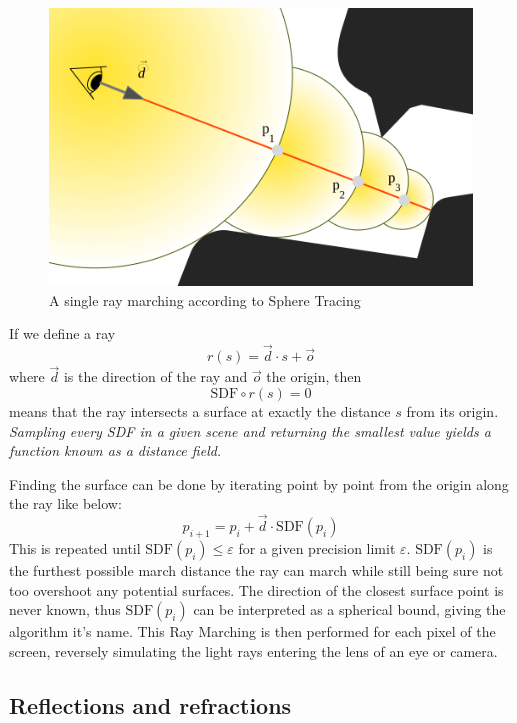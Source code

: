 		\vspace{40pt}
		\begin{figure}
			\begin{flushright}
				\includegraphics[width=0.9\linewidth]{figure/SDF2} 
			\end{flushright}
			\caption{ A single ray marching according to Sphere Tracing}
			\vspace{40pt}
		\end{figure}

		If we define a ray $$r(s) = \vec{d} \cdot s + \vec{o}$$
		where $\vec{d}$ is the direction of the ray and $\vec{o}$ the origin, then
		$$\text{SDF}\circ r(s) = 0$$ means that the ray intersects a surface at
		exactly the distance $s$ from its origin. \emph{Sampling every SDF in a
		given scene and returning the smallest value yields a function known as a
		distance field.}

		\bigskip \noindent Finding the surface can be done by iterating point by
		point from the origin along the ray like below: $$p_{i+1} = p_i +
		\vec{d}\cdot \text{SDF}(p_i)$$ This is repeated until $\text{SDF}(p_i) \leq
		\varepsilon$ for a given precision limit $\varepsilon$. $\text{SDF}(p_i)$
		is the furthest possible march distance the ray can march while still being
		sure not too overshoot any potential surfaces. The direction of the closest
		surface point is never known, thus $\text{SDF}(p_i)$ can be interpreted as
		a spherical bound, giving the algorithm it's name. This Ray Marching is
		then performed for each pixel of the screen, reversely simulating the light
		rays entering the lens of an eye or camera.

			\subsection{Reflections and refractions}

